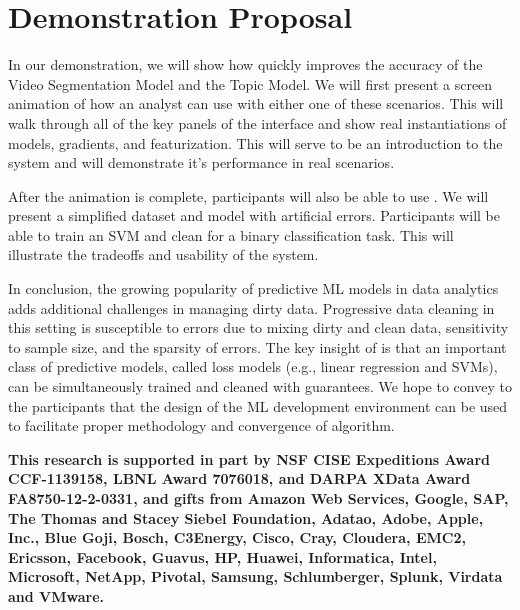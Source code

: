 \section{Demonstration Proposal}
In our demonstration, we will show how \sys quickly improves the accuracy of the Video Segmentation Model and the Topic Model.
We will first present a screen animation of how an analyst can use \sys with either one of these scenarios.
This will walk through all of the key panels of the interface and show real instantiations of models, gradients, and featurization.
This will serve to be an introduction to the system and will demonstrate it's performance in real scenarios.

After the animation is complete, participants will also be able to use \sys.
We will present a simplified dataset and model with artificial errors.
Participants will be able to train an SVM and clean for a binary classification task.
This will illustrate the tradeoffs and usability of the system.

In conclusion, the growing popularity of predictive ML models in data analytics adds additional challenges in managing dirty data.
Progressive data cleaning in this setting is susceptible to errors due to mixing dirty and clean data, sensitivity to sample size, and the sparsity of errors.
The key insight of \sys is that an important class of predictive models, called loss models (e.g., linear regression and SVMs), can be simultaneously trained and cleaned with guarantees.
We hope to convey to the participants that the design of the ML development environment can be used to facilitate proper methodology and convergence of algorithm.

\textbf{\small This research is supported in part by NSF CISE Expeditions Award CCF-1139158, LBNL Award 7076018, and DARPA XData Award FA8750-12-2-0331, and gifts from Amazon Web Services, Google, SAP, The Thomas and Stacey Siebel Foundation, Adatao, Adobe, Apple, Inc., Blue Goji, Bosch, C3Energy, Cisco, Cray, Cloudera, EMC2, Ericsson, Facebook, Guavus, HP, Huawei, Informatica, Intel, Microsoft, NetApp, Pivotal, Samsung, Schlumberger, Splunk, Virdata and VMware.}
